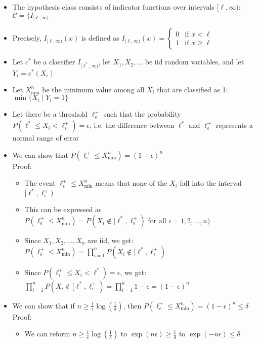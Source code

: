 \begin{itemize}
    \item The hypothesis class consists of indicator functions over intervals $[\ell, \infty)$: $\mathcal{C} = \{I_{[\ell, \infty)}$
    \item Precisely, $I_{[\ell, \infty)}(x)$ is defined as
    $
    I_{[\ell, \infty)}(x) =
    \begin{cases}
    0 & \text{if } x < \ell \\
    1 & \text{if } x \geq \ell
    \end{cases}
    $
    \item Let $c^*$ be a classifier $I_{[\ell^*, \infty)}$, let $X_1, X_2, \dots$ be iid random variables, and let $Y_i = c^*(X_i)$
    \item Let $X_{\min}^n$ be the minimum value among all $X_i$ that are classified as 1: $\min \{X_i \mid Y_i = 1\}$
    \item Let there be a threshold $\ell^+_\epsilon$ such that the probability $P(\ell^* \leq X_i < \ell^+_\epsilon) = \epsilon$, i.e. the difference between $\ell^*$ and $\ell^+_\epsilon$ represents a normal range of error
    \item We can show that $P(\ell^+_\epsilon \leq X_{\min}^n) = (1 - \epsilon)^n$\\
    Proof:
    \begin{itemize}
        \item The event $\ell^+_\epsilon \leq X_{\min}^n$ means that none of the $X_i$ fall into the interval $[\ell^*, \ell^+_\epsilon)$
        \item This can be expressed as $P(\ell^+_\epsilon \leq X_{\min}^n) = P(X_i \notin [\ell^*, \ell^+_\epsilon) \text{ for all } i = 1, 2, \dots, n)$
        \item Since $X_1, X_2, \dots, X_n$ are iid, we get: $P(\ell^+_\epsilon \leq X_{\min}^n) = \prod_{i=1}^n P(X_i \notin [\ell^*, \ell^+_\epsilon)$
        \item Since $P(\ell^+_\epsilon \leq X_i < \ell^*) = \epsilon$, we get: $\prod_{i=1}^n P(X_i \notin [\ell^*, \ell^+_\epsilon) = \prod_{i=1}^n 1 - \epsilon = (1 - \epsilon)^n$
    \end{itemize}
    \item We can show that if $n \geq \frac{1}{\epsilon}\log(\frac{1}{\delta})$, then $P(\ell^+_\epsilon \leq X_{\min}^n) = (1 - \epsilon)^n \leq \delta$\\
    Proof:
    \begin{itemize}
        \item We can reform $n \geq \frac{1}{\epsilon}\log(\frac{1}{\delta})$ to $\exp(n \epsilon) \geq \frac{1}{\delta}$ to $\exp(-n \epsilon) \leq \delta$

\end{itemize}
\end{itemize}
